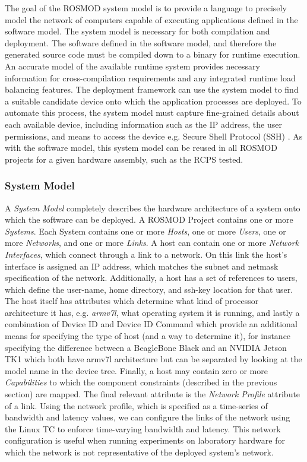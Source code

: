 The goal of the ROSMOD system model is to provide a language to precisely model the network of computers capable of executing applications defined in the software model. The system model is necessary for both compilation and deployment. The software defined in the software model, and therefore the generated source code must be compiled down to a binary for runtime execution. An accurate model of the available runtime system provides necessary information for cross-compilation requirements and any integrated runtime load balancing features. The deployment framework can use the system model to find a suitable candidate device onto which the application processes are deployed. To automate this process, the system model must capture fine-grained details about each available device, including information such as the IP address, the user permissions, and means to access the device e.g. Secure Shell Protocol (SSH) \cite{ylonen2006secure}. As with the software model, this system model can be reused in all ROSMOD projects for a given hardware assembly, such as the RCPS tested. 

\subsubsection{System Model} 

A \emph{System Model} completely describes the hardware architecture of a system onto which the software can be deployed. A ROSMOD Project contains one or more \emph{Systems}. Each System contains one or more \emph{Hosts}, one or more \emph{Users}, one or more \emph{Networks}, and one or more \emph{Links}.  A host can contain one or more \emph{Network Interfaces}, which connect through a link to a network.  On this link the host's interface is assigned an IP address, which matches the subnet and netmask specification of the network. Additionally, a host has a set of references to users, which define the user-name, home directory, and ssh-key location for that user. The host itself has attributes which determine what kind of processor architecture it has, e.g. \emph{armv7l}, what operating system it is running, and lastly a combination of Device ID and Device ID Command which provide an additional means for specifying the type of host (and a way to determine it), for instance specifying the difference between a BeagleBone Black and an NVIDIA Jetson TK1 which both have armv7l architecture but can be separated by looking at the model name in the device tree.  Finally, a host may contain zero or more \emph{Capabilities} to which the component constraints (described in the previous section) are mapped.  The final relevant attribute is the \emph{Network Profile} attribute of a link. Using the network profile, which is specified as a time-series of bandwidth and latency values, we can configure the links of the network using the Linux TC to enforce time-varying bandwidth and latency. This network configuration is useful when running experiments on laboratory hardware for which the network is not representative of the deployed system's
network.

